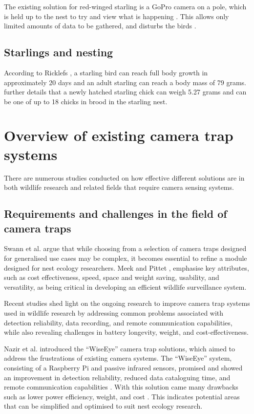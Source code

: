 \documentclass[class=report,11pt,crop=false]{standalone}
\begin{document}
The existing solution for red-winged starling is a GoPro camera on a pole, which is held up to the nest to try and view what is happening \cite{hofmeyer2024private}. This allows only limited amounts of data to be gathered, and disturbs the birds \cite{hofmeyer2024private}.

\subsection{Starlings and nesting}

According to Ricklefs \cite{ricklefs1968patterns}, a starling bird can reach full body growth in approximately 20 days and an adult starling can reach a body mass of 79 grams. \cite{ricklefs1968patterns} further details that a newly hatched starling chick can weigh 5.27 grams and can be one of up to 18 chicks in brood in the starling nest. 



\section{Overview of existing camera trap systems}

There are numerous studies conducted on how effective different solutions are in both wildlife research and related fields that require camera sensing systems. 

\subsection{Requirements and challenges in the field of camera traps}

Swann et al. \cite{swann2011evaluating} argue that while choosing from a selection of camera traps designed for generalised use cases may be complex, it becomes essential to refine a module designed for nest ecology researchers. Meek and Pittet \cite{meek2012user}, emphasise key attributes, such as cost effectiveness, speed, space and weight saving, usability, and versatility, as being critical in developing an efficient wildlife surveillance system.  

Recent studies shed light on the ongoing research to improve camera trap systems used in wildlife research by addressing common problems associated with detection reliability, data recording, and remote communication capabilities, while also revealing challenges in battery longevity, weight, and cost-effectiveness. 

Nazir et al. \cite{nazir2017wiseeye} introduced the “WiseEye” camera trap solutions, which aimed to address the frustrations of existing camera systems. The “WiseEye” system, consisting of a Raspberry Pi and passive infrared sensors, promised and showed an improvement in detection reliability, reduced data cataloguing time, and remote communication capabilities \cite{nazir2017wiseeye}. With this solution came many drawbacks such as lower power efficiency, weight, and cost \cite{nazir2017wiseeye}. This indicates potential areas that can be simplified and optimised to suit nest ecology research.  
\end{document}
